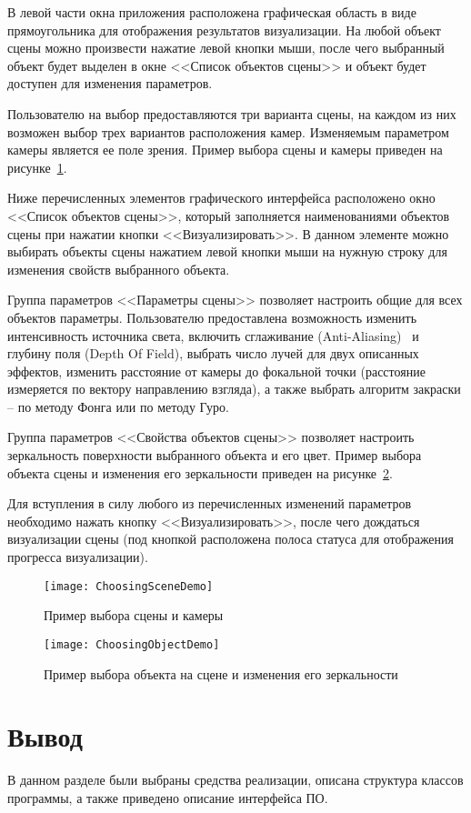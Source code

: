 В левой части окна приложения расположена графическая область в виде прямоугольника для отображения результатов визуализации. На любой объект сцены можно произвести нажатие левой кнопки мыши, после чего выбранный объект будет выделен в окне <<Список объектов сцены>> и объект будет доступен для изменения параметров.

Пользователю на выбор предоставляются три варианта сцены, на каждом из них возможен выбор трех вариантов расположения камер. Изменяемым параметром камеры является ее поле зрения. Пример выбора сцены и камеры приведен на рисунке~\ref{fig:ChoosingSceneDemo}.

Ниже перечисленных элементов графического интерфейса расположено окно <<Список объектов сцены>>, который заполняется наименованиями объектов сцены при нажатии кнопки <<Визуализировать>>. В данном элементе можно выбирать объекты сцены нажатием левой кнопки мыши на нужную строку для изменения свойств выбранного объекта.

Группа параметров <<Параметры сцены>> позволяет настроить общие для всех объектов параметры. Пользователю предоставлена возможность изменить интенсивность источника света, включить сглаживание (Anti-Aliasing)~\cite{Anti-aliasing} и глубину поля (Depth Of Field), выбрать число лучей для двух описанных эффектов, изменить расстояние от камеры до фокальной точки (расстояние измеряется по вектору направлению взгляда), а также выбрать алгоритм закраски -- по методу Фонга или по методу Гуро.

Группа параметров <<Свойства объектов сцены>> позволяет настроить зеркальность поверхности выбранного объекта и его цвет. Пример выбора объекта сцены и изменения его зеркальности приведен на рисунке~\ref{fig:ChoosingObjectDemo}.

Для вступления в силу любого из перечисленных изменений параметров необходимо нажать кнопку <<Визуализировать>>, после чего дождаться визуализации сцены (под кнопкой расположена полоса статуса для отображения прогресса визуализации).

\begin{figure}[H]
	\centering
	\texttt{[image: ChoosingSceneDemo]}
	\caption{Пример выбора сцены и камеры}
	\label{fig:ChoosingSceneDemo}
\end{figure}

\begin{figure}[H]
	\centering
	\texttt{[image: ChoosingObjectDemo]}
	\caption{Пример выбора объекта на сцене и изменения его зеркальности}
	\label{fig:ChoosingObjectDemo}
\end{figure}

\section*{Вывод}
В данном разделе были выбраны средства реализации, описана структура классов программы, а также приведено описание интерфейса ПО.

\clearpage
